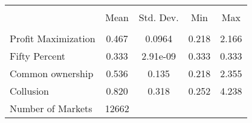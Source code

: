 \begin{tabular}{l c c c c}\\ \toprule \\ & Mean & Std. Dev. & Min & Max \\ \midrule \\ 
Profit Maximization &       0.467&      0.0964&       0.218&       2.166\\
Fifty Percent       &       0.333&    2.91e-09&       0.333&       0.333\\
Common ownership    &       0.536&       0.135&       0.218&       2.355\\
Collusion           &       0.820&       0.318&       0.252&       4.238\\
Number of Markets   &       12662&            &            &            \\
\bottomrule\end{tabular}
